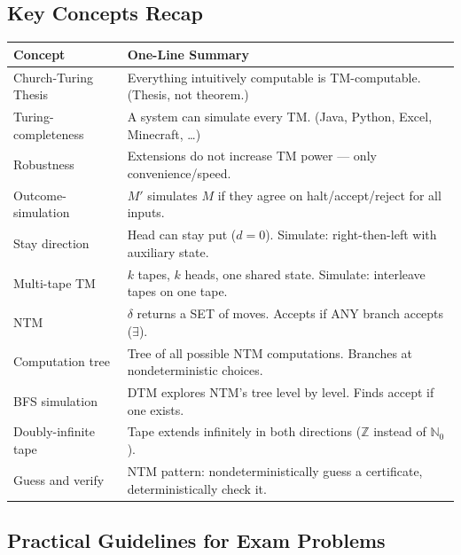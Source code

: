 \documentclass[11pt,a4paper]{article}
\begin{document}
\subsection{Key Concepts Recap}

\begin{center}
\begin{tabular}{p{3.5cm}p{8.5cm}}
\toprule
\textbf{Concept} & \textbf{One-Line Summary} \\
\midrule
Church-Turing Thesis & Everything intuitively computable is TM-computable. (Thesis, not theorem.) \\
Turing-completeness & A system can simulate every TM. (Java, Python, Excel, Minecraft, \ldots) \\
Robustness & Extensions do not increase TM power --- only convenience/speed. \\
Outcome-simulation & $M'$ simulates $M$ if they agree on halt/accept/reject for all inputs. \\
Stay direction & Head can stay put ($d=0$). Simulate: right-then-left with auxiliary state. \\
Multi-tape TM & $k$ tapes, $k$ heads, one shared state. Simulate: interleave tapes on one tape. \\
NTM & $\delta$ returns a SET of moves. Accepts if ANY branch accepts ($\exists$). \\
Computation tree & Tree of all possible NTM computations. Branches at nondeterministic choices. \\
BFS simulation & DTM explores NTM's tree level by level. Finds accept if one exists. \\
Doubly-infinite tape & Tape extends infinitely in both directions ($\mathbb{Z}$ instead of $\mathbb{N}_0$). \\
Guess and verify & NTM pattern: nondeterministically guess a certificate, deterministically check it. \\
\bottomrule
\end{tabular}
\end{center}

\subsection{Practical Guidelines for Exam Problems}
\end{document}
